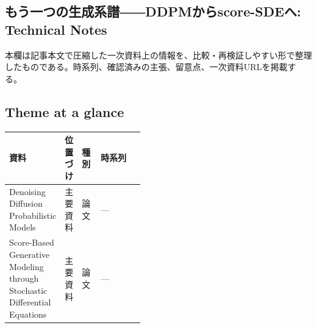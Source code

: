 \subsection*{もう一つの生成系譜――DDPMからscore-SDEへ: Technical Notes}
本欄は記事本文で圧縮した一次資料上の情報を、比較・再検証しやすい形で整理したものである。時系列、確認済みの主張、留意点、一次資料URLを掲載する。
\medskip
\subsection*{Theme at a glance}
\begin{center}
\footnotesize
\begin{tabularx}{\linewidth}{@{}p{0.20\linewidth}p{0.10\linewidth}p{0.14\linewidth}X@{}}
\toprule
資料 & 位置づけ & 種別 & 時系列 \\
\midrule
Denoising Diffusion Probabilistic Models & 主要資料 & 論文 & — \\
Score-Based Generative Modeling through Stochastic Differential Equations & 主要資料 & 論文 & — \\
\bottomrule
\end{tabularx}
\end{center}
\normalsize

